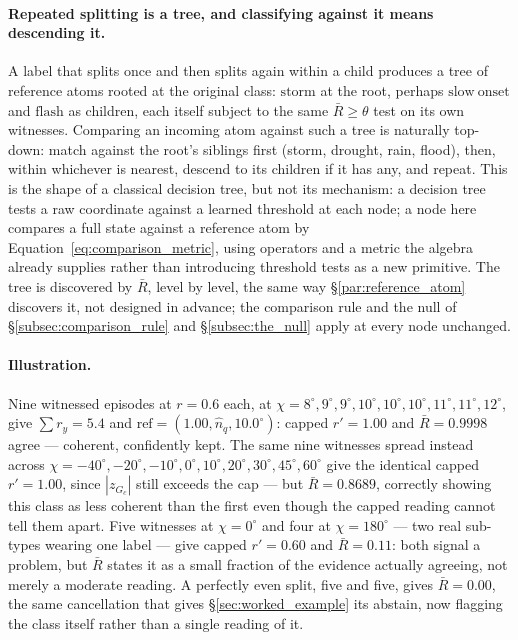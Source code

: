 \documentclass[12pt, a4paper]{article}
\begin{document}
\paragraph{Repeated splitting is a tree, and classifying against it
means descending it.} A label that splits once and then splits again
within a child produces a tree of reference atoms rooted at the
original class: $\mathrm{storm}$ at the root, perhaps $\mathrm{slow\
onset}$ and $\mathrm{flash}$ as children, each itself subject to the
same $\bar R\ge\theta$ test on its own witnesses. Comparing an
incoming atom against such a tree is naturally top-down: match against
the root's siblings first (storm, drought, rain, flood), then, within
whichever is nearest, descend to its children if it has any, and
repeat. This is the shape of a classical decision tree, but not its
mechanism: a decision tree tests a raw coordinate against a learned
threshold at each node; a node here compares a full state against a
reference atom by Equation~\eqref{eq:comparison_metric}, using
operators and a metric the algebra already supplies rather than
introducing threshold tests as a new primitive. The tree is discovered
by $\bar R$, level by level, the same way \S\ref{par:reference_atom}
discovers it, not designed in advance; the comparison rule and the
null of \S\ref{subsec:comparison_rule} and \S\ref{subsec:the_null}
apply at every node unchanged.

\paragraph{Illustration.}
\label{par:reference_atom_illustration}
Nine witnessed episodes at $r=0.6$ each, at
$\chi=8^\circ,9^\circ,9^\circ,10^\circ,10^\circ,10^\circ,11^\circ,
11^\circ,12^\circ$, give $\sum r_y=5.4$ and
$\mathrm{ref}=(1.00,\hat n_q,10.0^\circ)$: capped $r'=1.00$ and
$\bar R=0.9998$ agree --- coherent, confidently kept. The same nine
witnesses spread instead across
$\chi=-40^\circ,-20^\circ,-10^\circ,0^\circ,10^\circ,20^\circ,
30^\circ,45^\circ,60^\circ$ give the identical capped $r'=1.00$, since
$|z_{G_c}|$ still exceeds the cap --- but $\bar R=0.8689$, correctly
showing this class as less coherent than the first even though the
capped reading cannot tell them apart. Five witnesses at $\chi=0^\circ$
and four at $\chi=180^\circ$ --- two real sub-types wearing one
label --- give capped $r'=0.60$ and $\bar R=0.11$: both signal a
problem, but $\bar R$ states it as a small fraction of the evidence
actually agreeing, not merely a moderate reading. A perfectly even
split, five and five, gives $\bar R=0.00$, the same cancellation that
gives \S\ref{sec:worked_example} its abstain, now flagging the class
itself rather than a single reading of it.
\end{document}
